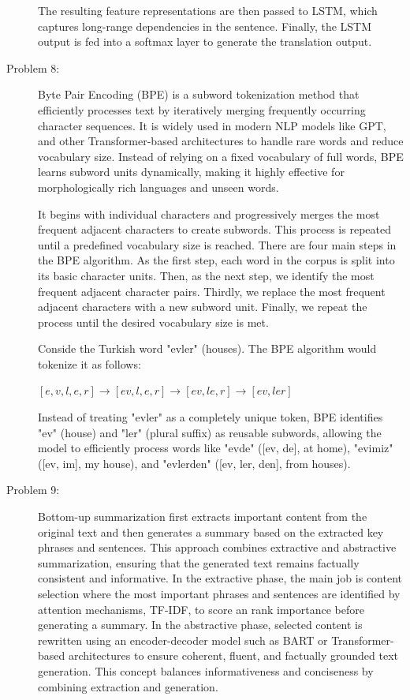 \documentclass[10pt]{article}
\begin{document}
\begin{description}
The resulting feature representations are then passed to LSTM, which captures long-range dependencies in the sentence.
Finally, the LSTM output is fed into a softmax layer to generate the translation output.

\pagebreak

\item[Problem 8:]  \hfill %

Byte Pair Encoding (BPE) is a subword tokenization method that efficiently processes text by iteratively merging frequently occurring character sequences. 
It is widely used in modern NLP models like GPT, and other Transformer-based architectures to handle rare words and reduce vocabulary size. 
Instead of relying on a fixed vocabulary of full words, BPE learns subword units dynamically, making it highly effective for morphologically rich languages and unseen words.

It begins with individual characters and progressively merges the most frequent adjacent characters to create subwords. 
This process is repeated until a predefined vocabulary size is reached. There are four main steps in the BPE algorithm.
As the first step, each word in the corpus is split into its basic character units. Then, as the next step, we identify the most frequent adjacent character pairs.
Thirdly, we replace the most frequent adjacent characters with a new subword unit.
Finally, we repeat the process until the desired vocabulary size is met.

Conside the Turkish word "evler" (houses). The BPE algorithm would tokenize it as follows:

\begin{center}
    $[e, v, l, e, r] \rightarrow [ev, l, e, r] \rightarrow [ev, le, r] \rightarrow [ev, ler]$
\end{center}

Instead of treating "evler" as a completely unique token, BPE identifies "ev" (house) and "ler" (plural suffix) as reusable subwords, 
allowing the model to efficiently process words like "evde" ([ev, de], at home), "evimiz" ([ev, im], my house), and "evlerden" ([ev, ler, den], from houses).

\pagebreak

\item[Problem 9:]  \hfill %

Bottom-up summarization first extracts important content from the original text and then generates a summary based on the extracted key phrases and sentences.
This approach combines extractive and abstractive summarization, ensuring that the generated text remains factually consistent and informative.
In the extractive phase, the main job is content selection where the most important phrases and sentences are identified by attention mechanisms, 
TF-IDF, to score an rank importance before generating a summary.
In the abstractive phase, selected content is rewritten using an encoder-decoder model such as BART or Transformer-based architectures 
to ensure coherent, fluent, and factually grounded text generation.
This concept balances informativeness and conciseness by combining extraction and generation.


\end{description}
\end{document}
